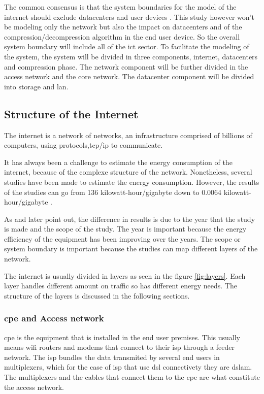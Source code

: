 The common consensus is that the system boundaries for the model of the internet should exclude datacenters and user devices \citet{Coroama2014}. This study however won't be modeling only the network but also the impact on datacenters and of the compression/decompression algorithm in the end user device. So the overall system boundary will include all of the \ac{ict} sector. To facilitate the modeling of the system, the system will be divided in three components, internet,  datacenters and compression phase. The network component will be further divided in the access network and the core network. The datacenter component will be divided into storage and \ac{lan}.



\subsection{Structure of the Internet}

The internet is a network of networks, an infrastructure comprised of billions of computers, 
using protocols,\ac{tcp}/\ac{ip} to communicate.

It has always been a challenge to estimate the energy consumption of the internet, because of the complexe structure of the network. Nonetheless, several studies have been made to estimate the energy consumption. However, the results of the studies can go from 136 \ac{kilowatt-hour}/\ac{gigabyte}
\citet{Koomey2003} down to 0.0064 \ac{kilowatt-hour}/\ac{gigabyte} \citet{Baliga2011}.

As \citet{Coroama2015} and later \citet{Aslan2018} point out, the difference in results is due to the year that the study is made and the scope of the study. 
The year is important because the energy efficiency of the equipment has been improving over the years. 
The scope or system boundary is important because the studies can map different layers of the network.

The internet is usually divided in layers as seen in the figure \ref{fig:layers}. 
Each layer handles different amount on traffic so has different energy needs.
The structure of the layers is discussed in the following sections.

\subsubsection{\acl{cpe} and Access network}

\ac{cpe} is the equipment that is installed in the end user premises. This usually means wifi routers and modems that connect to their \ac{isp} through a feeder network. The \ac{isp} bundles the data transmited by several end users in multiplexers, which for the case of \ac{isp} that use \ac{dsl} connectivety they are \ac{dslam}. The multiplexers and the cables that connect them to the \ac{cpe} are what constitute the access network.

